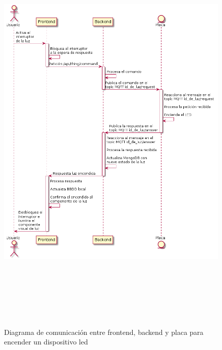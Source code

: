 \begin{figure}[hbt!]
\label{usecase2}
\includegraphics[height=8in]{figures/diagrams/use-cases/turnOnLight.png}
\caption[usecase2]{Diagrama de comunicación entre frontend, backend y placa para encender un dispositivo led\footnotemark}
\end{figure}

